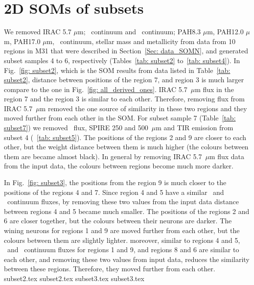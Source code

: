 \newpage
\appendix
\section{2D SOMs of subsets}
\label{sec: app_2d_soms_SOMN}

      
        We removed IRAC 5.7 $\mu$m; \sii~continuum and \oiii~continuum; PAH8.3 $\mu$m, PAH12.0 $\mu$m, PAH17.0 $\mu$m, \oiii~continuum, stellar mass and metallicity from data from 10 regions in M31 that were described in Section~\ref{Sec: data_SOMN}, and generated subset samples 4 to 6, respectively (Tables~\ref{tab: subset2} to~\ref{tab: subset4}).
        In Fig.~\ref{fig: subset2}, which is the SOM results from data listed in Table~\ref{tab: subset2}, distance between positions of the region 7, and region 3 is much larger compare to the one in Fig.~\ref{fig: all_derived_ones}. 
        IRAC 5.7~$\mu$m flux in the region 7 and the region 3 is similar to each other. 
        Therefore, removing flux from IRAC 5.7~$\mu$m removed the one source of similarity in these two regions and they moved further from each other in the SOM.
        For subset sample 7 (Table~\ref{tab: subset7}) we removed \sii~flux, SPIRE 250 and 500~$\mu$m and TIR emission from subset 4 (~\ref{tab: subset5}).
        The positions of the regions 2 and 9 are closer to each other, but the weight distance between them is much higher (the colours between them are became almost black). 
        In general by removing IRAC 5.7~$\mu$m flux data from the input data, the colours between regions become much more darker.
      
        In Fig.~\ref{fig: subset3}, the positions from the region 9 is much closer to the positions of the regions 4 and 7. 
        Since region 4 and 5 have a similar \oiii~and \sii~continuum fluxes, by removing these two values from the input data distance between regions 4 and 5 became much smaller.
        The positions of the regions 2 and 6 are closer together, but the colours between their neurons are darker.
        The wining neurons for regions 1 and 9 are moved further from each other, but the colours between them are slightly lighter. 
        moreover, similar to regions 4 and 5, \oiii~and \sii~continuum fluxes for regions 1 and 9, and regions 8 and 6 are similar to each other, and removing these two values from input data, reduces the similarity between these regions. Therefore, they moved further from each other. 
         {subset2.tex}
        {subset2.tex}
        {subset3.tex}
        {subset3.tex}
        
